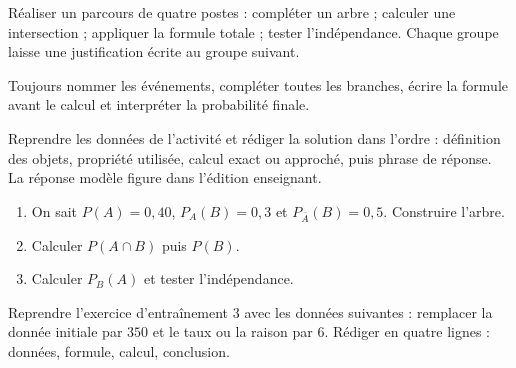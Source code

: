 \begin{activite}
Réaliser un parcours de quatre postes : compléter un arbre ; calculer une intersection ; appliquer la formule totale ; tester l'indépendance. Chaque groupe laisse une justification écrite au groupe suivant.

\end{activite}

\begin{traceecrite}Toujours nommer les événements, compléter toutes les branches, écrire la formule avant le calcul et interpréter la probabilité finale.\end{traceecrite}

\begin{exemple}
Reprendre les données de l'activité et rédiger la solution dans l'ordre : définition des objets, propriété utilisée, calcul exact ou approché, puis phrase de réponse. La réponse modèle figure dans l'édition enseignant.
\end{exemple}

\begin{exercice}[-- essentiel]
\begin{enumerate}\item On sait $P(A)=0{,}40$, $P_A(B)=0{,}3$ et $P_{\overline A}(B)=0{,}5$. Construire l'arbre.\item Calculer $P(A\cap B)$ puis $P(B)$.\item Calculer $P_B(A)$ et tester l'indépendance.\end{enumerate}
\end{exercice}


\begin{dm}Reprendre l'exercice d'entraînement 3 avec les données suivantes : remplacer la donnée initiale par $350$ et le taux ou la raison par $6$. Rédiger en quatre lignes : données, formule, calcul, conclusion.\end{dm}

